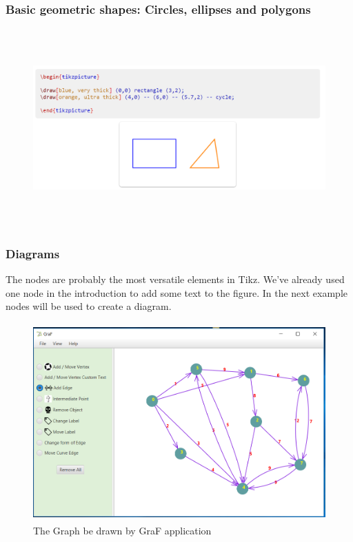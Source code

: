 \documentclass[a4paper,10pt]{article}
\begin{document}
\subsubsection{Basic geometric shapes: Circles, ellipses and polygons}
\begin{figure}[H]
		\centering
		\includegraphics[height = 3in]{tkz_01.png}
		\caption[Optional caption]{}
		\label{fig:Repository}
	\end{figure}
\paragraph{}

\paragraph{}

\subsubsection{Diagrams}
The nodes are probably the most versatile elements in Tikz. We've already used one node in the introduction to add some text to the figure. In the next example nodes will be used to create a diagram.
\begin{figure}[H]
		\centering
		\includegraphics[height = 3in]{graph_tkz.png}
		\caption[Optional caption]{The Graph be drawn by GraF application}
		\label{fig:Repository}
	\end{figure}
\end{document}
